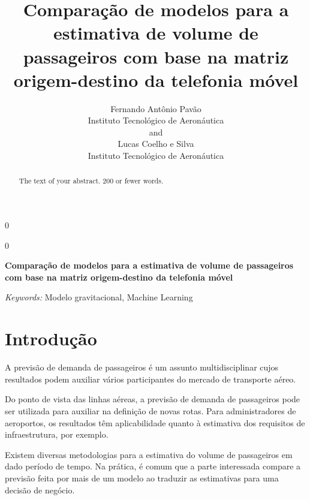 \documentclass[12pt]{article}
\newcommand{\blind}{0}
\begin{document}
\def\spacingset#1{\renewcommand{\baselinestretch}%
{#1}\small\normalsize} \spacingset{1}



\blind
{
  \title{\bf Comparação de modelos para a estimativa de volume de passageiros com
base na matriz origem-destino da telefonia móvel}

  \author{
        Fernando Antônio Pavão \\
    Instituto Tecnológico de Aeronáutica\\
     and \\     Lucas Coelho e Silva \\
    Instituto Tecnológico de Aeronáutica\\
      }
  \maketitle
} \fi

\blind
{
  \bigskip
  \bigskip
  \bigskip
  \begin{center}
    {\LARGE\bf Comparação de modelos para a estimativa de volume de passageiros com
base na matriz origem-destino da telefonia móvel}
  \end{center}
  \medskip
} \fi

\bigskip
\begin{abstract}
The text of your abstract. 200 or fewer words.
\end{abstract}

\noindent%
{\it Keywords:} Modelo gravitacional, Machine Learning
\vfill

\newpage
\spacingset{1.45} %

\hypertarget{introduuxe7uxe3o}{%
\section{Introdução}\label{introduuxe7uxe3o}}

A previsão de demanda de passageiros é um assunto multidisciplinar cujos
resultados podem auxiliar vários participantes do mercado de transporte
aéreo.

Do ponto de vista das linhas aéreas, a previsão de demanda de
passageiros pode ser utilizada para auxiliar na definição de novas
rotas. Para administradores de aeroportos, os resultados têm
aplicabilidade quanto à estimativa dos requisitos de infraestrutura, por
exemplo.

Existem diversas metodologias para a estimativa do volume de passageiros
em dado período de tempo. Na prática, é comum que a parte interessada
compare a previsão feita por mais de um modelo ao traduzir as
estimativas para uma decisão de negócio.
\end{document}
